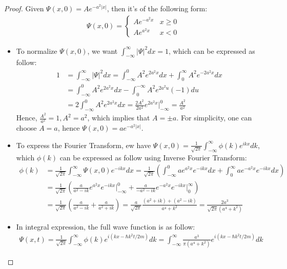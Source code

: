 \documentclass{article}
\begin{document}
\begin{proof}
    Given $\Psi(x,0)=Ae^{-a^2|x|}$, then it's of the following form:
    \begin{align}
        \Psi(x,0)=\begin{cases}
            Ae^{-a^2x} & x\geq 0\\
            Ae^{a^2x} & x<0
        \end{cases}
    \end{align}

    \begin{itemize}
        \item[1.] To normalize $\Psi(x,0)$, we want $\int_{-\infty}^{\infty}|\Psi|^2dx=1$, which can be expressed as follow:
        \begin{align}
            1&=\int_{-\infty}^{\infty}|\Psi|^2 dx = \int_{-\infty}^{0}A^2e^{2a^2x}dx + \int_{0}^{\infty}A^2e^{-2a^2x}dx\\
            &= \int_{-\infty}^{0}A^2e^{2a^2x}dx-\int_{0}^{-\infty}A^2e^{2a^2u}(-1)du\\
            &= 2\int_{-\infty}^{0}A^2e^{2a^2x}dx = \frac{2A^2}{2a^2}e^{2a^2x}\bigg|_{-\infty}^{0} = \frac{A^2}{a^2}
        \end{align}
        Hence, $\frac{A^2}{a^2}=1, A^2=a^2$, which implies that $A=\pm a$. For simplicity, one can choose $A=a$, hence $\Psi(x,0)=ae^{-a^2|x|}$.

        \hfil

        \item[2.] To express the Fourier Transform, ew have $\Psi(x,0)=\frac{1}{\sqrt{2\pi}}\int_{-\infty}^{\infty}\phi(k)e^{ikx}dk$, which $\phi(k)$ can be expressed as follow using Inverse Fourier Transform:
        \begin{align}
            \phi(k)&=\frac{1}{\sqrt{2\pi}}\int_{-\infty}^{\infty}\Psi(x,0)e^{-ikx}dx = \frac{1}{\sqrt{2\pi}}\left(\int_{-\infty}^{0}ae^{a^2x}e^{-ikx}dx+\int_{0}^{\infty}ae^{-a^2x}e^{-ikx}dx\right)\\
            &= \frac{1}{\sqrt{2\pi}}\left(\frac{a}{a^2-ik}e^{a^2x}e^{-ikx}\bigg|_{-\infty}^{0}+\frac{a}{-a^2-ik}e^{-a^2x}e^{-ikx}\bigg|_{0}^{\infty}\right)\\
            &= \frac{1}{\sqrt{2\pi}}\left(\frac{a}{a^2-ik}+\frac{a}{a^2+ik}\right) = \frac{a}{\sqrt{2\pi}}\frac{(a^2+ik)+(a^2-ik)}{a^4+k^2} = \frac{2a^3}{\sqrt{2\pi}(a^4+k^2)}    
        \end{align}

        \hfil

        \item[3.] In integral expression, the full wave function is as follow:
        \begin{align}
            \Psi(x,t) = \frac{1}{\sqrt{2\pi}}\int_{-\infty}^{\infty}\phi(k)e^{i(kx-\hbar k^2t/2m)}dk =\int_{-\infty}^{\infty}\frac{a^3}{\pi(a^4+k^2)}e^{i(kx-\hbar k^2t/2m)}dk
        \end{align}


\end{itemize}
\end{proof}
\end{document}
